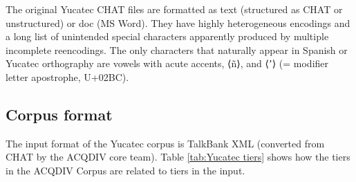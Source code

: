 \documentclass[a4paper, 11pt]{book}
\begin{document}
The original Yucatec CHAT files are formatted as text (structured as CHAT or unstructured) or doc (MS Word). They have highly heterogeneous encodings and a long list of unintended special characters apparently produced by multiple incomplete reencodings. The only characters that naturally appear in Spanish or Yucatec orthography are vowels with acute accents, ⟨ñ⟩, and ⟨ʼ⟩ (= modifier letter apostrophe, U+02BC).

\subsection{Corpus format}

The input format of the Yucatec corpus is TalkBank XML (converted from CHAT by the ACQDIV core team). Table \autoref{tab:Yucatec tiers} shows how the tiers in the ACQDIV Corpus are related to tiers in the input.
\end{document}
